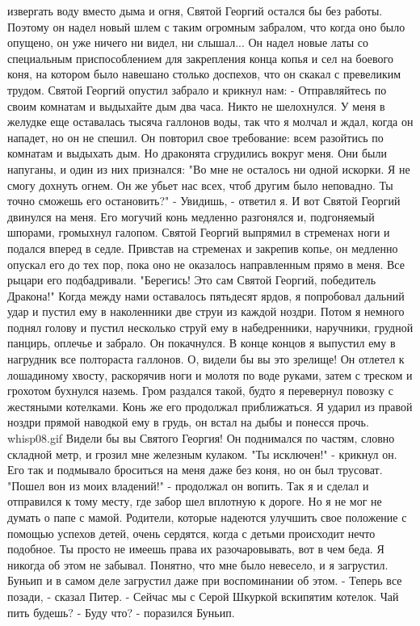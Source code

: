 извергать воду вместо дыма и огня, Святой Георгий остался бы без 
работы. Поэтому он надел новый шлем с таким огромным забралом, что 
когда оно было опущено, он уже ничего ни видел, ни слышал... Он надел 
новые латы со специальным приспособлением для закрепления конца копья 
и сел на боевого коня, на котором было навешано столько доспехов, что 
он скакал с превеликим трудом.
    Святой Георгий опустил забрало и крикнул нам:
    - Отправляйтесь по своим комнатам и выдыхайте дым два часа.
    Никто не шелохнулся.
    У меня в желудке еще оставалась тысяча галлонов воды, так что я 
молчал и ждал, когда он нападет, но он не спешил. Он повторил свое 
требование: всем разойтись по комнатам и выдыхать дым. Но драконята 
сгрудились вокруг меня. Они были напуганы, и один из них признался: 
"Во мне не осталось ни одной искорки. Я не смогу дохнуть огнем. Он же 
убьет нас всех, чтоб другим было неповадно. Ты точно сможешь его 
остановить?"
    - Увидишь, - ответил я.
    И вот Святой Георгий двинулся на меня. Его могучий конь медленно 
разгонялся и, подгоняемый шпорами, громыхнул галопом. Святой Георгий 
выпрямил в стременах ноги и подался вперед в седле. Привстав на 
стременах и закрепив копье, он медленно опускал его до тех пор, пока 
оно не оказалось направленным прямо в меня. Все рыцари его 
подбадривали. "Берегись! Это сам Святой Георгий, победитель Дракона!"
    Когда между нами оставалось пятьдесят ярдов, я попробовал дальний 
удар и пустил ему в наколенники две струи из каждой ноздри. Потом я 
немного поднял голову и пустил несколько струй ему в набедренники, 
наручники, грудной панцирь, оплечье и забрало. Он покачнулся. В конце 
концов я выпустил ему в нагрудник все полтораста галлонов. О, видели 
бы вы это зрелище! Он отлетел к лошадиному хвосту, раскорячив ноги и 
молотя по воде руками, затем с треском и грохотом бухнулся наземь. 
Гром раздался такой, будто я перевернул повозку с жестяными котелками. 
Конь же его продолжал приближаться. Я ударил из правой ноздри прямой 
наводкой ему в грудь, он встал на дыбы и понесся прочь.
    {whisp08.gif}
    Видели бы вы Святого Георгия! Он поднимался по частям, словно 
складной метр, и грозил мне железным кулаком. "Ты исключен!" - крикнул 
он. Его так и подмывало броситься на меня даже без коня, но он был 
трусоват. "Пошел вон из моих владений!" - продолжал он вопить.
    Так я и сделал и отправился к тому месту, где забор шел вплотную к 
дороге. Но я не мог не думать о папе с мамой. Родители, которые 
надеются улучшить свое положение с помощью успехов детей, очень 
сердятся, когда с детьми происходит нечто подобное. Ты просто не 
имеешь права их разочаровывать, вот в чем беда. Я никогда об этом не 
забывал. Понятно, что мне было невесело, и я загрустил.
    Буньип и в самом деле загрустил даже при воспоминании об этом.
    - Теперь все позади, - сказал Питер. - Сейчас мы с Серой Шкуркой 
вскипятим котелок. Чай пить будешь?
    - Буду что? - поразился Буньип.

